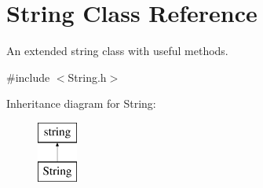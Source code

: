 \hypertarget{classString}{}\section{String Class Reference}
\label{classString}


An extended string class with useful methods.  




{\ttfamily \#include $<$String.\+h$>$}

Inheritance diagram for String\+:\begin{figure}[H]
\begin{center}
\leavevmode
\includegraphics[height=2.000000cm]{classString}
\end{center}
\end{figure}
